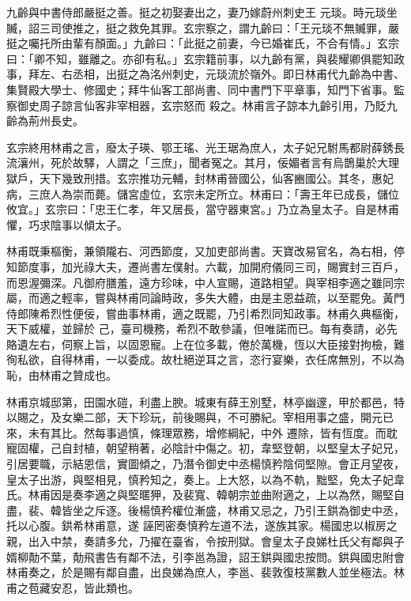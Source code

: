 \begin{pinyinscope}
 九齡與中書侍郎嚴挺之善。挺之初娶妻出之，妻乃嫁蔚州刺史王
 元琰。時元琰坐贓，詔三司使推之，挺之救免其罪。玄宗察之，謂九齡曰：「王元琰不無贓罪，嚴挺之囑托所由輩有顏面。」九齡曰：「此挺之前妻，今已婚崔氏，不合有情。」玄宗曰：「卿不知，雖離之。亦卻有私。」玄宗籍前事，以九齡有黨，與裴耀卿俱罷知政事，拜左、右丞相，出挺之為洺州刺史，元琰流於嶺外。即日林甫代九齡為中書、集賢殿大學士、修國史；拜牛仙客工部尚書、同中書門下平章事，知門下省事。監察御史周子諒言仙客非宰相器，玄宗怒而
 殺之。林甫言子諒本九齡引用，乃貶九齡為荊州長史。



 玄宗終用林甫之言，廢太子瑛、鄂王瑤、光王琚為庶人，太子妃兄駙馬都尉薛銹長流瀼州，死於故驛，人謂之「三庶」，聞者冤之。其月，佞媚者言有烏鵲巢於大理獄戶，天下幾致刑措。玄宗推功元輔，封林甫晉國公，仙客豳國公。其冬，惠妃病，三庶人為崇而薨。儲宮虛位，玄宗未定所立。林甫曰：「壽王年已成長，儲位攸宜。」玄宗曰：「忠王仁孝，年又居長，當守器東宮。」乃立為皇太子。自是林甫
 懼，巧求陰事以傾太子。



 林甫既秉樞衡，兼領隴右、河西節度，又加吏部尚書。天寶改易官名，為右相，停知節度事，加光祿大夫，遷尚書左僕射。六載，加開府儀同三司，賜實封三百戶，而恩渥彌深。凡御府膳羞，遠方珍味，中人宣賜，道路相望。與宰相李適之雖同宗屬，而適之輕率，嘗與林甫同論時政，多失大體，由是主恩益疏，以至罷免。黃門侍郎陳希烈性便佞，嘗曲事林甫，適之既罷，乃引希烈同知政事。林甫久典樞衡，天下威權，並歸於
 己，臺司機務，希烈不敢參議，但唯諾而已。每有奏請，必先賂遺左右，伺察上旨，以固恩寵。上在位多載，倦於萬機，恆以大臣接對拘檢，難徇私欲，自得林甫，一以委成。故杜絕逆耳之言，恣行宴樂，衣任席無別，不以為恥，由林甫之贊成也。



 林甫京城邸第，田園水磑，利盡上腴。城東有薛王別墅，林亭幽邃，甲於都邑，特以賜之，及女樂二部，天下珍玩，前後賜與，不可勝紀。宰相用事之盛，開元已來，未有其比。然每事過慎，條理眾務，增修綱紀，中外
 遷除，皆有恆度。而耽寵固權，己自封植，朝望稍著，必陰計中傷之。初，韋堅登朝，以堅皇太子妃兄，引居要職，示結恩信，實圖傾之，乃潛令御史中丞楊慎矜陰伺堅隙。會正月望夜，皇太子出游，與堅相見，慎矜知之，奏上。上大怒，以為不軌，黜堅，免太子妃韋氏。林甫因是奏李適之與堅暱狎，及裴寬、韓朝宗並曲附適之，上以為然，賜堅自盡，裴、韓皆坐之斥逐。後楊慎矜權位漸盛，林甫又忌之，乃引王鉷為御史中丞，托以心腹。鉷希林甫意，遂
 誣罔密奏慎矜左道不法，遂族其家。楊國忠以椒房之親，出入中禁，奏請多允，乃擢在臺省，令按刑獄。會皇太子良娣杜氏父有鄰與子婿柳勣不葉，勣飛書告有鄰不法，引李邕為證，詔王鉷與國忠按問。鉷與國忠附會林甫奏之，於是賜有鄰自盡，出良娣為庶人，李邕、裴敦復枝黨數人並坐極法。林甫之苞藏安忍，皆此類也。




\end{pinyinscope}
